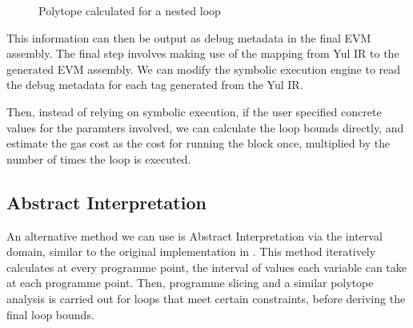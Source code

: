 \begin{figure}[!h]
  \centering
  \caption{Polytope calculated for a nested loop}
  \label{fig:polytopes}
\end{figure}

This information can then be output as debug metadata in the final EVM assembly.
The final step involves making use of the mapping from Yul IR to the generated EVM assembly. 
We can modify the symbolic execution engine to read the debug metadata for each tag generated from the Yul IR.

Then, instead of relying on symbolic execution, if the user specified concrete values
for the paramters involved, we can calculate the loop bounds directly, and estimate the gas cost as the
cost for running the block once, multiplied by the number of times the loop is executed.

\subsection{Abstract Interpretation}

An alternative method we can use is Abstract Interpretation via the interval domain, similar to the original implementation in \cite{loopanalysis}.
This method iteratively calculates at every programme point, the interval of values each variable can take at each programme point.
Then, programme slicing and a similar polytope analysis is carried out for loops that meet certain constraints, before deriving the
final loop bounds. 

